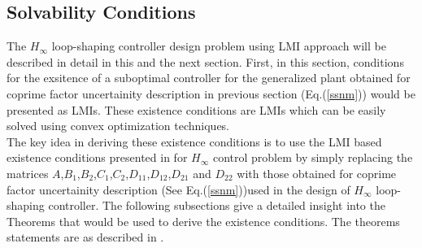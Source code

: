 \documentclass[a4paper,12pt]{article}
\begin{document}
	\subsection{Solvability Conditions}
		The $H_{\infty}$	 loop-shaping controller design problem using LMI approach will be described in detail in this and the next section. First, in this section, conditions for the exsitence of a suboptimal controller for the generalized plant obtained for coprime factor uncertainity description in previous section (Eq.(\ref{ssnm})) would be presented as LMIs. These existence conditions are LMIs which can be easily solved using convex optimization techniques.\\
		The key idea in deriving these existence conditions is to use the LMI based existence conditions presented in \cite{Pasca} for $H_{\infty}$ control problem by simply replacing the matrices $A$,$B_{1}$,$B_{2}$,$C_{1}$,$C_{2}$,$D_{11}$,$D_{12}$,$D_{21}$ and $D_{22}$ with those obtained for coprime factor uncertainity description (See Eq.(\ref{ssnm}))used in the design of $H_{\infty}$ loop-shaping controller. The following subsections give a detailed insight into the Theorems that would be used to derive the existence conditions. The theorems statements are as described in \cite{Pasca}.
\end{document}
